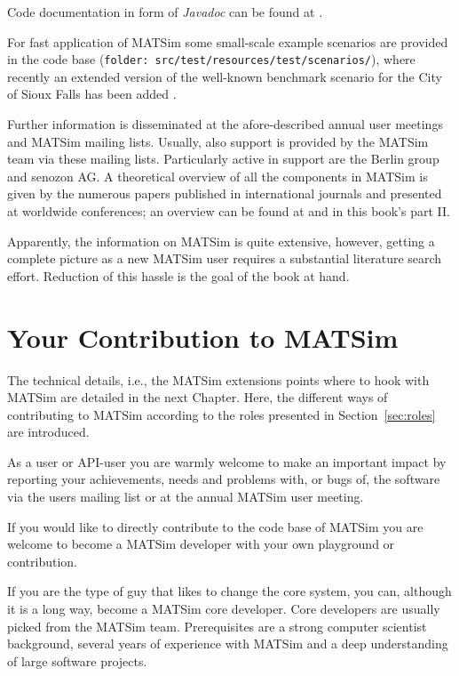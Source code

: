 Code documentation in form of \emph{Javadoc} can be found at \citet[][]{MATSIM-T-Javadoc_Webpage_2014}. 

For fast application of MATSim some small-scale example scenarios are provided in the code base (\lstinline|folder: src/test/resources/test/scenarios/|), where recently an extended version of the well-known benchmark scenario for the City of Sioux Falls has been added \citep[][]{ChakirovFourie_TechRep_FCL_2014}.

Further information is disseminated at the afore-described annual user meetings and MATSim mailing lists. Usually, also support is provided by the MATSim team via these mailing lists. Particularly active in support are the Berlin group and senozon AG. A theoretical overview of all the components in MATSim is given by the numerous papers published in international journals and presented at worldwide conferences; an overview can be found at \citep[][]{MATSIM-T-Publications_Webpage_2014} and in this book's part II.

Apparently, the information on MATSim is quite extensive, however, getting a complete picture as a new MATSim user requires a substantial literature search effort. Reduction of this hassle is the goal of the book at hand.

\section{Your Contribution to MATSim}
\label{sec:yourcontribution}
The technical details, i.e., the MATSim extensions points where to hook with MATSim are detailed in the next Chapter. Here, the different ways of contributing to MATSim according to the roles presented in Section~\ref{sec:roles} are introduced.

As a user or API-user you are warmly welcome to make an important impact by reporting your achievements, needs and problems with, or bugs of, the software via the users mailing list or at the annual MATSim user meeting. 

If you would like to directly contribute to the code base of MATSim you are welcome to become a MATSim developer with your own playground or contribution.

If you are the type of guy that likes to change the core system, you can, although it is a long way, become a MATSim core developer. Core developers are usually picked from the MATSim team. Prerequisites are a strong computer scientist background, several years of experience with MATSim and a deep understanding of large software projects.

